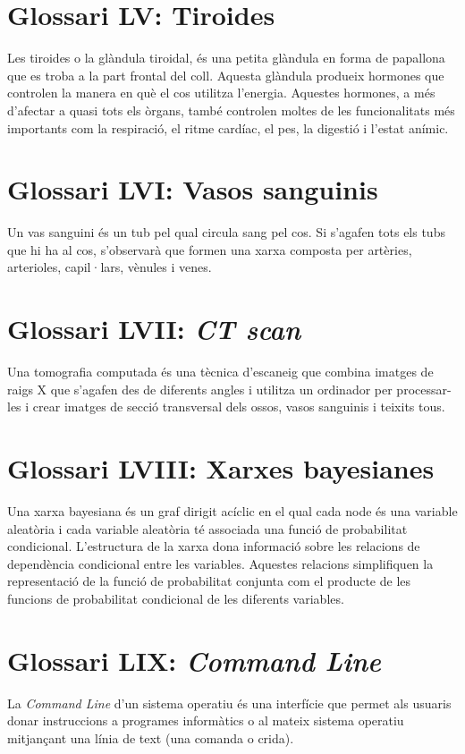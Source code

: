 \documentclass[a4paper,12pt]{report}
\begin{document}
\section*{Glossari LV: Tiroides}
Les tiroides o la glàndula tiroidal, és una petita glàndula en forma de papallona que es troba a la part frontal del coll. Aquesta glàndula produeix hormones que controlen la manera en què el cos utilitza l'energia. Aquestes hormones, a més d'afectar a quasi tots els òrgans, també controlen moltes de les funcionalitats més importants com la respiració, el ritme cardíac, el pes, la digestió i l'estat anímic.
\section*{Glossari LVI: Vasos sanguinis}
Un vas sanguini és un tub pel qual circula sang pel cos. Si s'agafen tots els tubs que hi ha al cos, s'observarà que formen una xarxa composta per artèries, arterioles, capil·lars, vènules i venes.
\section*{Glossari LVII: \textit{CT scan}}
Una tomografia computada és una tècnica d'escaneig que combina imatges de raigs X que s'agafen des de diferents angles i utilitza un ordinador per processar-les i crear imatges de secció transversal dels ossos, vasos sanguinis i teixits tous.
\section*{Glossari LVIII: Xarxes bayesianes}
Una xarxa bayesiana és un graf dirigit acíclic en el qual cada node és una variable aleatòria i cada variable aleatòria té associada una funció de probabilitat condicional. L'estructura de la xarxa dona informació sobre les relacions de dependència condicional entre les variables. Aquestes relacions simplifiquen la representació de la funció de probabilitat conjunta com el producte de les funcions de probabilitat condicional de les diferents variables.
\section*{Glossari LIX: \textit{Command Line}}
La \textit{Command Line} d'un sistema operatiu és una interfície que permet als usuaris donar instruccions a programes informàtics o al mateix sistema operatiu mitjançant una línia de text (una comanda o crida).
\end{document}

